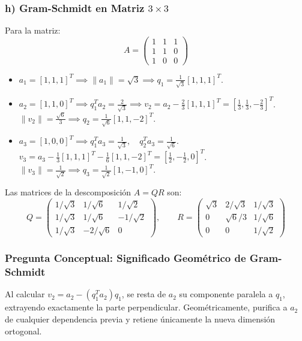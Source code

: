\documentclass[11pt,a4paper]{article}
\theoremstyle{definition}
\theoremstyle{remark}
\begin{document}
\subsubsection{h) Gram-Schmidt en Matriz $3 \times 3$}
Para la matriz:
\begin{equation}
    A = \begin{pmatrix}
        1 & 1 & 1 \\
        1 & 1 & 0 \\
        1 & 0 & 0
    \end{pmatrix}
\end{equation}
\begin{itemize}[leftmargin=*]
    \item $a_1 = [1, 1, 1]^T \implies \|a_1\| = \sqrt{3} \implies q_1 = \frac{1}{\sqrt{3}} [1, 1, 1]^T$.
    \item $a_2 = [1, 1, 0]^T \implies q_1^T a_2 = \frac{2}{\sqrt{3}} \implies v_2 = a_2 - \frac{2}{3}[1, 1, 1]^T = \left[\frac{1}{3}, \frac{1}{3}, -\frac{2}{3}\right]^T$. \\
    $\|v_2\| = \frac{\sqrt{6}}{3} \implies q_2 = \frac{1}{\sqrt{6}} [1, 1, -2]^T$.
    \item $a_3 = [1, 0, 0]^T \implies q_1^T a_3 = \frac{1}{\sqrt{3}}, \quad q_2^T a_3 = \frac{1}{\sqrt{6}}$. \\
    $v_3 = a_3 - \frac{1}{3}[1, 1, 1]^T - \frac{1}{6}[1, 1, -2]^T = \left[\frac{1}{2}, -\frac{1}{2}, 0\right]^T$. \\
    $\|v_3\| = \frac{1}{\sqrt{2}} \implies q_3 = \frac{1}{\sqrt{2}} [1, -1, 0]^T$.
\end{itemize}

Las matrices de la descomposición $A = QR$ son:
\begin{equation}
    Q = \begin{pmatrix}
        1/\sqrt{3} & 1/\sqrt{6} & 1/\sqrt{2} \\
        1/\sqrt{3} & 1/\sqrt{6} & -1/\sqrt{2} \\
        1/\sqrt{3} & -2/\sqrt{6} & 0
    \end{pmatrix}, \qquad
    R = \begin{pmatrix}
        \sqrt{3} & 2/\sqrt{3} & 1/\sqrt{3} \\
        0 & \sqrt{6}/3 & 1/\sqrt{6} \\
        0 & 0 & 1/\sqrt{2}
    \end{pmatrix}
\end{equation}

\subsubsection{Pregunta Conceptual: Significado Geométrico de Gram-Schmidt}
Al calcular $v_2 = a_2 - (q_1^T a_2)q_1$, se resta de $a_2$ su componente paralela a $q_1$, extrayendo exactamente la parte perpendicular. Geométricamente, purifica a $a_2$ de cualquier dependencia previa y retiene únicamente la nueva dimensión ortogonal.
\end{document}
